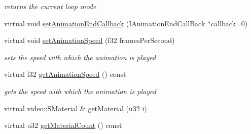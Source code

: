 \begin{DoxyCompactItemize}
\begin{DoxyCompactList}\small\item\em returns the current loop mode \end{DoxyCompactList}\item 
virtual void \hyperlink{classirr_1_1scene_1_1_c_animated_mesh_scene_node_a25284d330fa43e267e96dd813c64c186}{set\-Animation\-End\-Callback} (I\-Animation\-End\-Call\-Back $\ast$callback=0)
\item 
virtual void \hyperlink{classirr_1_1scene_1_1_c_animated_mesh_scene_node_af8363de0bc0e852364d22a0f71872011}{set\-Animation\-Speed} (f32 frames\-Per\-Second)
\begin{DoxyCompactList}\small\item\em sets the speed with which the animation is played \end{DoxyCompactList}\item 
\hypertarget{classirr_1_1scene_1_1_c_animated_mesh_scene_node_a74115e490b5a8728667a41feecb257ca}{virtual f32 \hyperlink{classirr_1_1scene_1_1_c_animated_mesh_scene_node_a74115e490b5a8728667a41feecb257ca}{get\-Animation\-Speed} () const }\label{classirr_1_1scene_1_1_c_animated_mesh_scene_node_a74115e490b5a8728667a41feecb257ca}

\begin{DoxyCompactList}\small\item\em gets the speed with which the animation is played \end{DoxyCompactList}\item 
virtual video\-::\-S\-Material \& \hyperlink{classirr_1_1scene_1_1_c_animated_mesh_scene_node_ac2e1a6e20462500a12d3306faaccfb1a}{get\-Material} (u32 i)
\item 
\hypertarget{classirr_1_1scene_1_1_c_animated_mesh_scene_node_a42cac0c1edf7b1c9b7cc059bddbe930b}{virtual u32 \hyperlink{classirr_1_1scene_1_1_c_animated_mesh_scene_node_a42cac0c1edf7b1c9b7cc059bddbe930b}{get\-Material\-Count} () const }\label{classirr_1_1scene_1_1_c_animated_mesh_scene_node_a42cac0c1edf7b1c9b7cc059bddbe930b}


\end{DoxyCompactItemize}
